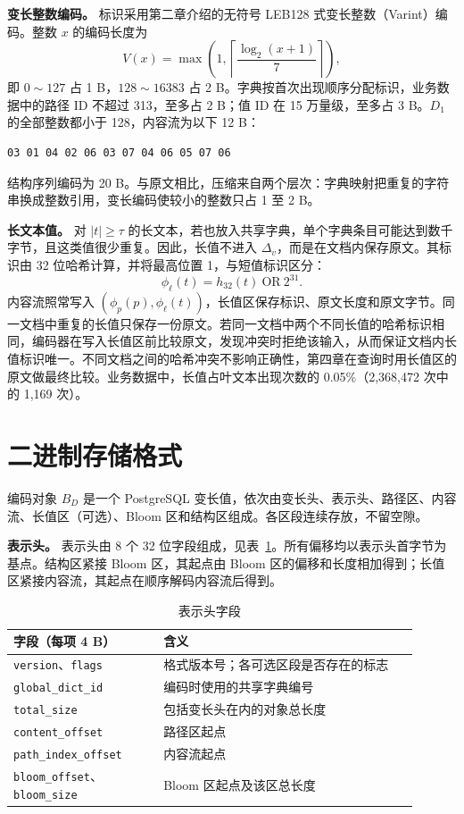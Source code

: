 \textbf{变长整数编码。} 标识采用第二章介绍的无符号 LEB128 式变长整数（Varint）编码\cite{williams1999compressing}。整数 $x$ 的编码长度为
\[
V(x)=\max\left(1,\left\lceil\frac{\log_2(x+1)}{7}\right\rceil\right),
\]
即 $0\sim127$ 占 1 B，$128\sim16383$ 占 2 B。字典按首次出现顺序分配标识，业务数据中的路径 ID 不超过 313，至多占 2 B；值 ID 在 15 万量级，至多占 3 B。$D_1$ 的全部整数都小于 128，内容流为以下 12 B：
\begin{lstlisting}[caption={订单文档 $D_1$ 的内容流字节},label={lst:rep-content-bytes},numbers=none]
03 01 04 02 06 03 07 04 06 05 07 06
\end{lstlisting}
结构序列编码为 20 B。与原文相比，压缩来自两个层次：字典映射把重复的字符串换成整数引用，变长编码使较小的整数只占 1 至 2 B。

\textbf{长文本值。} 对 $|t|\ge\tau$ 的长文本，若也放入共享字典，单个字典条目可能达到数千字节，且这类值很少重复。因此，长值不进入 $\Delta_v$，而是在文档内保存原文。其标识由 32 位哈希计算，并将最高位置 1，与短值标识区分：
\[
\phi_\ell(t)=h_{32}(t)\ \mathrm{OR}\ 2^{31}.
\]
内容流照常写入 $(\phi_p(p),\phi_\ell(t))$，长值区保存标识、原文长度和原文字节。同一文档中重复的长值只保存一份原文。若同一文档中两个不同长值的哈希标识相同，编码器在写入长值区前比较原文，发现冲突时拒绝该输入，从而保证文档内长值标识唯一。不同文档之间的哈希冲突不影响正确性，第四章在查询时用长值区的原文做最终比较。业务数据中，长值占叶文本出现次数的 0.05\%（2,368,472 次中的 1,169 次）。

\section{二进制存储格式}
\label{sec:rep-binary}

编码对象 $B_D$ 是一个 PostgreSQL 变长值，依次由变长头、表示头、路径区、内容流、长值区（可选）、Bloom 区和结构区组成。各区段连续存放，不留空隙。

\textbf{表示头。} 表示头由 8 个 32 位字段组成，见表~\ref{tab:representation-header}。所有偏移均以表示头首字节为基点。结构区紧接 Bloom 区，其起点由 Bloom 区的偏移和长度相加得到；长值区紧接内容流，其起点在顺序解码内容流后得到。

\begin{table}[htbp]
\centering\small
\caption{表示头字段}
\label{tab:representation-header}
\begin{tabular}{p{0.33\linewidth}p{0.57\linewidth}}
\toprule
字段（每项 4 B） & 含义 \\
\midrule
\texttt{version}、\texttt{flags} & 格式版本号；各可选区段是否存在的标志 \\
\texttt{global\_dict\_id} & 编码时使用的共享字典编号 \\
\texttt{total\_size} & 包括变长头在内的对象总长度 \\
\texttt{content\_offset} & 路径区起点 \\
\texttt{path\_index\_offset} & 内容流起点 \\
\texttt{bloom\_offset}、\texttt{bloom\_size} & Bloom 区起点及该区总长度 \\
\bottomrule
\end{tabular}
\end{table}


